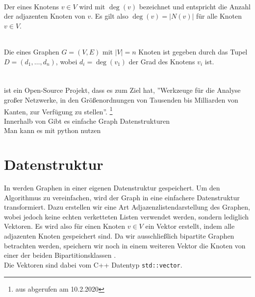 \begin{definition}[Knotengrad]~\\
Der  eines Knotens $v \in V$ wird mit $\deg(v)$ bezeichnet und entspricht die Anzahl
der adjazenten Knoten von $v$. Es gilt also $\deg(v) = |N(v)|$ für alle Knoten $v\in V$.

\end{definition}
\begin{definition}[Gradsequenz]~\\
Die  eines Graphen $G = (V,E)$ mit $|V| = n$ Knoten ist gegeben durch das Tupel
$D = (d_{1}, \dots, d_{n})$, wobei $d_{i} = \deg(v_{1})$ der Grad des Knotens $v_{i}$ ist.
\end{definition}





\section{\nk}

\nk \cite{nk} ist ein Open-Source Projekt, dass es zum Ziel hat, ''Werkzeuge für die
Analyse großer Netzwerke, in den Größenordnungen von Tausenden bis Milliarden 
von Kanten, zur Verfügung zu stellen''.
\footnote{aus \cite{nk} abgerufen am 10.2.2020}
\\
Innerhalb von \nk Gibt es einfache Graph Datenstrukturen 
\\
Man kann es mit python nutzen 






\section{Datenstruktur}
In \nk {} werden Graphen in einer eigenen Datenstruktur gespeichert. Um den Algorithmus 
zu vereinfachen, wird der Graph in eine einfachere Datenstruktur transformiert. Dazu erstellen wir 
eine Art Adjazenzlistendarstellung des Graphen, wobei jedoch keine echten verketteten
Listen verwendet werden, sondern lediglich Vektoren. 
Es wird also für einen Knoten
$v \in V$ ein Vektor erstellt, indem alle adjazenten Knoten gespeichert sind.
Da wir ausschließlich bipartite Graphen betrachten werden, speichern wir noch in 
einem weiteren Vektor die Knoten von einer der beiden Bipartitionsklassen .
\\
Die Vektoren sind dabei vom C++ Datentyp \texttt{std::vector}.

